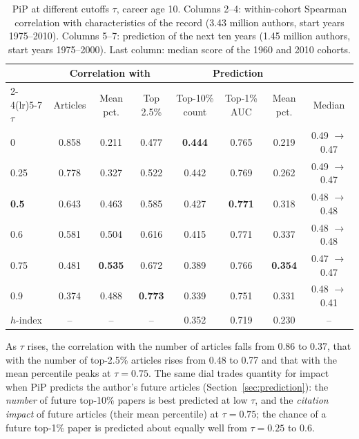 \documentclass[11pt]{article}
\begin{document}
\begin{table}[t]
  \centering
  \footnotesize
  \setlength{\tabcolsep}{4.5pt}
  \begin{threeparttable}
  \caption{PiP at different cutoffs $\tau$, career age 10. Columns 2--4: within-cohort Spearman correlation with
  characteristics of the record (3.43 million authors, start years 1975--2010). Columns 5--7: prediction of the next
  ten years (1.45 million authors, start years 1975--2000). Last column: median score of the 1960 and 2010 cohorts.}
  \label{tab:tau}
  \begin{tabular}{lccccccc}
    \toprule
    & \multicolumn{3}{c}{Correlation with} & \multicolumn{3}{c}{Prediction} & \\
    \cmidrule(lr){2-4}\cmidrule(lr){5-7}
    $\tau$ & Articles & Mean pct. & Top 2.5\% & Top-10\% count & Top-1\% AUC & Mean pct. & Median \\
    \midrule
    0 & 0.858 & 0.211 & 0.477 & \textbf{0.444} & 0.765 & 0.219 & 0.49 $\to$ 0.47 \\
    0.25 & 0.778 & 0.327 & 0.522 & 0.442 & 0.769 & 0.262 & 0.49 $\to$ 0.47 \\
    \textbf{0.5} & 0.643 & 0.463 & 0.585 & 0.427 & \textbf{0.771} & 0.318 & 0.48 $\to$ 0.48 \\
    0.6 & 0.581 & 0.504 & 0.616 & 0.415 & 0.771 & 0.337 & 0.48 $\to$ 0.48 \\
    0.75 & 0.481 & \textbf{0.535} & 0.672 & 0.389 & 0.766 & \textbf{0.354} & 0.47 $\to$ 0.47 \\
    0.9 & 0.374 & 0.488 & \textbf{0.773} & 0.339 & 0.751 & 0.331 & 0.48 $\to$ 0.41 \\
    \midrule
    $h$-index & -- & -- & -- & 0.352 & 0.719 & 0.230 & -- \\
    \bottomrule
  \end{tabular}
  \end{threeparttable}
\end{table}

As $\tau$ rises, the correlation with the number of articles falls from 0.86 to 0.37, that with the number of
top-2.5\% articles rises from 0.48 to 0.77 and that with the mean percentile peaks at $\tau = 0.75$. The same dial
trades quantity for impact when PiP predicts the author's future articles (Section~\ref{sec:prediction}): the
\emph{number} of future top-10\% papers is best predicted at low $\tau$, and the \emph{citation impact} of future
articles (their mean percentile) at $\tau = 0.75$; the chance of a future top-1\% paper is predicted about equally well
from $\tau = 0.25$ to $0.6$.
\end{document}
